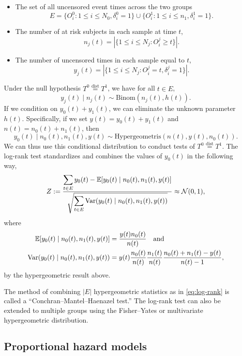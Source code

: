 \begin{itemize}
    \item The set of all uncensored event times across the two groups \[
        E = \{O_i^0 : 1 \le i \le N_0, \delta_i^0=1\} \cup \{O_i^1 : 1 \le i \le n_1, \delta_i^1=1\}.
        \]
    \item The number of at risk subjects in each sample at time $t$, 
    \[n_j(t) = |\{1 \le i \le N_j : O_i^j \ge t\}|.\]
    \item The number of uncensored times in each sample equal to $t$, \[y_j(t) = |\{1 \le i \le N_j : O_i^j =t, \delta_i^j=1\}|. \]
\end{itemize}
Under the null hypothesis $T^0  \stackrel{\text{dist}}{=} T^1$, we have for all $t \in E$, 
\[y_j(t) \mid n_j(t) \sim \mathrm{Binom}(n_j(t), h(t)). \]
If we condition on $y_0(t)+y_1(t)$, we can eliminate the unknown parameter $h(t)$. Specifically, if we set $y(t)=y_0(t)+y_1(t)$ and $n(t)=n_0(t)+n_1(t)$, then
\[y_0(t)\mid n_0(t),n_1(t), y(t) \sim \mathrm{Hypergeometris}(n(t), y(t), n_0(t)). \]
We can thus use this conditional distribution to conduct tests of $T^0 \stackrel{\text{dist}}{=} T^1$.  The log-rank test standardizes and combines the values of $y_0(t)$ in the following way,
\begin{equation}\label{eq:log-rank}
    Z := \frac{\displaystyle{\sum_{t \in E} y_0(t) - {\mathbb E}[y_0(t) \mid n_0(t),n_1(t),y(t)]}}{\displaystyle{\sqrt{\sum_{t \in E} \mathrm{Var}(y_0(t)\mid n_0(t), n_1(t), y(t))}}} \approx {\mathcal N}(0,1),
\end{equation}
where 
\begin{align*}
    {\mathbb E}[y_0(t) \mid n_0(t),n_1(t), y(t)] &= \frac{y(t)n_0(t)}{n(t)} \quad \text{and }\\
    \mathrm{Var}(y_0(t)\mid n_0(t), n_1(t), y(t)) &= y(t)\frac{n_0(t)}{n(t)}\frac{n_1(t)}{n(t)}\frac{n_0(t)+n_1(t)-y(t)}{n(t)-1},\\
\end{align*} 
by the hypergeometric result above. 

The method of combining $|E|$ hypergeometric statistics as in \eqref{eq:log-rank} is called a ``Conchran--Mantel--Haenazel test.'' The log-rank test can also be extended to multiple groups using the Fisher--Yates or multivariate hypergeometric distribution. 

\subsection{Proportional hazard models}

